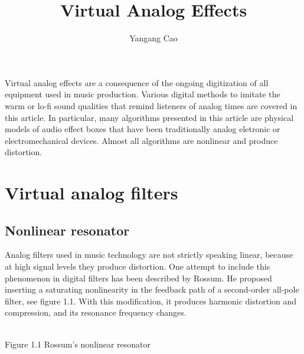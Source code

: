 \documentclass[10pt,a4paper,oneside]{article}
\author{Yangang Cao}
\newcommand{\product}{$\displaystyle \times$}
\newcommand{\delay}{\large$T$}
\begin{document}
\title{Virtual Analog Effects}
\maketitle 
Virtual analog effects are a consequence of the ongoing digitization of all equipment used in music production. Various digital methods to imitate the warm or lo-fi sound qualities that remind listeners of analog times are covered in this article. In particular, many algorithms presented in this article are physical models of audio effect boxes that have been traditionally analog eletronic or electromechanical devices. Almost all algorithms are nonlinear and produce distortion.
\section{Virtual analog filters}
\subsection{Nonlinear resonator}
Analog filters used in music technology are not strictly speaking linear, because at high signal levels they produce distortion. One attempt to include this phenomenon in digital filters has been described by Rossum. He proposed inserting a saturating nonlinearity in the feedback path of a second-order all-pole filter, see figure 1.1. With this modification, it produces harmonic distortion and compression, and its resonance frequency changes.
\begin{center}
\\Figure 1.1 Rossum's nonlinear resonator
\end{center}
 
\end{document}

